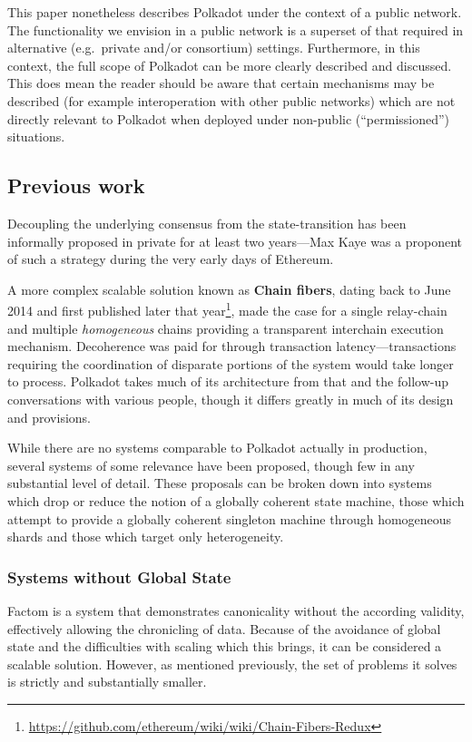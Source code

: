 \documentclass[9pt,oneside]{amsart}
\makeatletter
\newcommand*\eg{e.g.\@\xspace}
\makeatother
\begin{document}
\begin{multicols}{2}
 This paper nonetheless describes Polkadot under the context of a public network. The functionality we envision in a public network is a superset of that required in alternative (\eg~private and/or consortium) settings. Furthermore, in this context, the full scope of Polkadot can be more clearly described and discussed. This does mean the reader should be aware that certain mechanisms may be described (for example interoperation with other public networks) which are not directly relevant to Polkadot when deployed under non-public (``permissioned'') situations.

\subsection{Previous work}\label{previous-work}

 Decoupling the underlying consensus from the state-transition has been informally proposed in private for at least two years---Max Kaye was a proponent of such a strategy during the very early days of Ethereum.

A more complex scalable solution known as \textbf{Chain fibers}, dating back to June 2014 and first published later that year\footnote{\url{https://github.com/ethereum/wiki/wiki/Chain-Fibers-Redux}}, made the case for a single relay-chain and multiple \emph{homogeneous} chains providing a transparent interchain execution mechanism. Decoherence was paid for through transaction latency---transactions requiring the coordination of disparate portions of the system would take longer to process. Polkadot takes much of its architecture from that and the follow-up conversations with various people, though it differs greatly in much of its design and provisions.

 While there are no systems comparable to Polkadot actually in production, several systems of some relevance have been proposed, though few in any substantial level of detail. These proposals can be broken down into systems which drop or reduce the notion of a globally coherent state machine, those which attempt to provide a globally coherent singleton machine through homogeneous shards and those which target only heterogeneity.

\subsubsection{Systems without Global State}\label{non-global-state}

Factom \cite{snow2014factom} is a system that demonstrates canonicality without the according validity, effectively allowing the chronicling of data. Because of the avoidance of global state and the difficulties with scaling which this brings, it can be considered a scalable solution. However, as mentioned previously, the set of problems it solves is strictly and substantially smaller.


\end{multicols}
\end{document}
